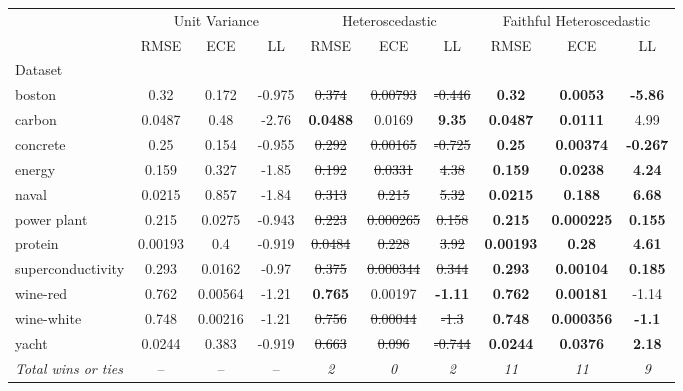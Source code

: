 \begin{tabular}{l|ccc|ccc|ccc}
\toprule
 & \multicolumn{3}{|c}{Unit Variance} & \multicolumn{3}{|c}{Heteroscedastic} & \multicolumn{3}{|c}{Faithful Heteroscedastic} \\
 & RMSE & ECE & LL & RMSE & ECE & LL & RMSE & ECE & LL \\
Dataset &  &  &  &  &  &  &  &  &  \\
\midrule
boston & 0.32 & 0.172 & -0.975 & \sout{0.374} & \sout{0.00793} & \sout{-0.446} & \textbf{0.32} & \textbf{0.0053} & \textbf{-5.86} \\
carbon & 0.0487 & 0.48 & -2.76 & \textbf{0.0488} & 0.0169 & \textbf{9.35} & \textbf{0.0487} & \textbf{0.0111} & 4.99 \\
concrete & 0.25 & 0.154 & -0.955 & \sout{0.292} & \sout{0.00165} & \sout{-0.725} & \textbf{0.25} & \textbf{0.00374} & \textbf{-0.267} \\
energy & 0.159 & 0.327 & -1.85 & \sout{0.192} & \sout{0.0331} & \sout{4.38} & \textbf{0.159} & \textbf{0.0238} & \textbf{4.24} \\
naval & 0.0215 & 0.857 & -1.84 & \sout{0.313} & \sout{0.215} & \sout{5.32} & \textbf{0.0215} & \textbf{0.188} & \textbf{6.68} \\
power plant & 0.215 & 0.0275 & -0.943 & \sout{0.223} & \sout{0.000265} & \sout{0.158} & \textbf{0.215} & \textbf{0.000225} & \textbf{0.155} \\
protein & 0.00193 & 0.4 & -0.919 & \sout{0.0484} & \sout{0.228} & \sout{3.92} & \textbf{0.00193} & \textbf{0.28} & \textbf{4.61} \\
superconductivity & 0.293 & 0.0162 & -0.97 & \sout{0.375} & \sout{0.000344} & \sout{0.344} & \textbf{0.293} & \textbf{0.00104} & \textbf{0.185} \\
wine-red & 0.762 & 0.00564 & -1.21 & \textbf{0.765} & 0.00197 & \textbf{-1.11} & \textbf{0.762} & \textbf{0.00181} & -1.14 \\
wine-white & 0.748 & 0.00216 & -1.21 & \sout{0.756} & \sout{0.00044} & \sout{-1.3} & \textbf{0.748} & \textbf{0.000356} & \textbf{-1.1} \\
yacht & 0.0244 & 0.383 & -0.919 & \sout{0.663} & \sout{0.096} & \sout{-0.744} & \textbf{0.0244} & \textbf{0.0376} & \textbf{2.18} \\
\textit{{Total wins or ties}} & -- & -- & -- & \textit{2} & \textit{0} & \textit{2} & \textit{11} & \textit{11} & \textit{9} \\
\bottomrule
\end{tabular}
